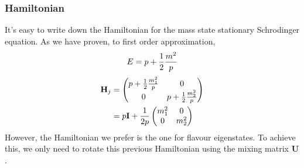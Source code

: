 \documentclass[letterpaper,12pt,english]{sphinxmanual}
\begin{document}
\subsubsection{Hamiltonian}
\label{oscillations:hamiltonian}
It's easy to write down the Hamiltonian for the mass state stationary Schrodinger equation. As we have proven, to first order approximation,
\begin{gather}
\begin{split}E = p + \frac{1}{2}\frac{m^2}{p}\end{split}\notag
\end{gather}\begin{gather}
\begin{split}\mathbf H_j &= \begin{pmatrix} p + \frac{1}{2}\frac{m_1^2}{p} & 0 \\ 0 & p + \frac{1}{2}\frac{m_2^2}{p} \end{pmatrix} \\
& = p \mathbf I + \frac{1}{2p}\begin{pmatrix} m_1^2 & 0 \\ 0 & m_2^2 \end{pmatrix}\end{split}\notag
\end{gather}
However, the Hamiltonian we prefer is the one for flavour eigenstates. To achieve this, we only need to rotate this previous Hamiltonian using the mixing matrix \(\mathbf U\).
\end{document}
